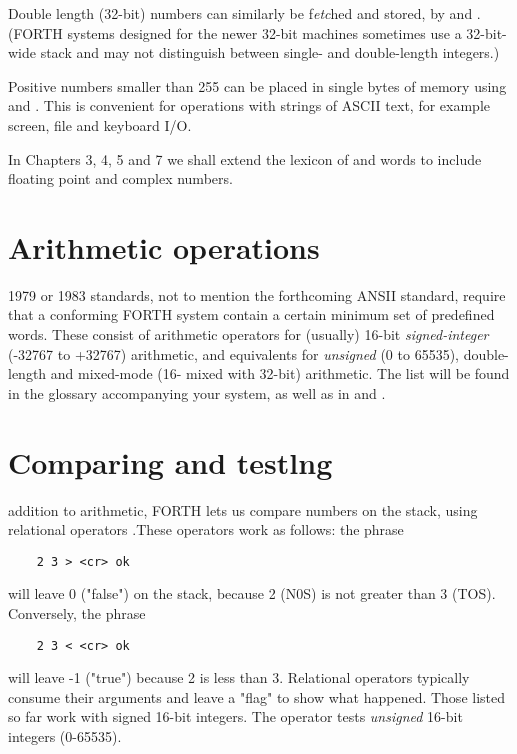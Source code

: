 Double length (32-bit) numbers can similarly be f\textit{etc}hed and stored, by  and  . (FORTH systems designed for the newer 32-bit machines sometimes use a 32-bit-wide stack and may not distinguish between single- and double-length integers.)

Positive numbers smaller than 255 can be placed in single bytes of memory using  and . This is convenient for operations with strings of ASCII text, for example screen, file and keyboard I/O.

In Chapters 3, 4, 5 and 7 we shall extend the lexicon of  and \bc{!} words to include floating point and complex numbers.

\section{Arithmetic operations}

 1979 or 1983 standards, not to mention the forthcoming ANSII standard, require that a conforming FORTH system contain a certain minimum set of predefined words. These consist of arithmetic operators  for (usually) 16-bit \textit{signed-integer} (-32767 to +32767) arithmetic, and equivalents for \textit{unsigned} (0 to 65535), double-length and mixed-mode (16- mixed with 32-bit) arithmetic. The list will be found in the glossary accompanying your system, as well as in \SF and \FTR.

\section{Comparing and testlng}

 addition to arithmetic, FORTH lets us compare numbers on the stack, using relational operators \bc{> < =}.These operators work as follows: the phrase

\begin{lstlisting}
    2 3 > <cr> ok
\end{lstlisting}

will leave 0 ("false") on the stack, because 2 (N0S) is not greater
than 3 (TOS). Conversely, the phrase

\begin{lstlisting}
    2 3 < <cr> ok
\end{lstlisting}

will leave -1 ("true") because 2 is less than 3. Relational operators typically consume their arguments and leave a "ﬂag" to show what happened. Those listed so far work with signed 16-bit integers. The operator  tests \textit{unsigned} 16-bit integers (0-65535).

